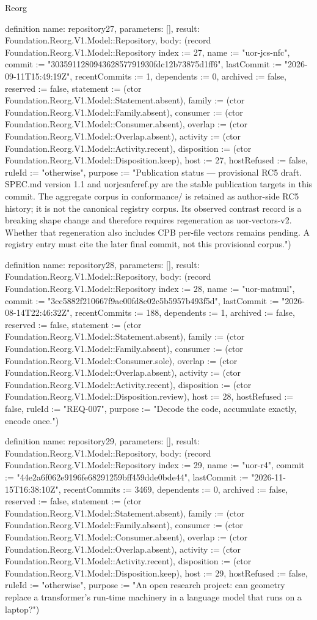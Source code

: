 \begin{lexlean}{Reorg}
\begin{semanticmodule}
definition{
  name: repository27,
  parameters: [],
  result: Foundation.Reorg.V1.Model::Repository,
  body: (record Foundation.Reorg.V1.Model::Repository {index := 27, name := "uor-jcs-nfc", commit := "303591128094362857791930fdc12b73875d1ff6", lastCommit := "2026-09-11T15:49:19Z", recentCommits := 1, dependents := 0, archived := false, reserved := false, statement := (ctor Foundation.Reorg.V1.Model::Statement.absent), family := (ctor Foundation.Reorg.V1.Model::Family.absent), consumer := (ctor Foundation.Reorg.V1.Model::Consumer.absent), overlap := (ctor Foundation.Reorg.V1.Model::Overlap.absent), activity := (ctor Foundation.Reorg.V1.Model::Activity.recent), disposition := (ctor Foundation.Reorg.V1.Model::Disposition.keep), host := 27, hostRefused := false, ruleId := "otherwise", purpose := "Publication status — provisional RC5 draft. SPEC.md version 1.1 and uorjcsnfcref.py are the stable publication targets in this commit. The aggregate corpus in conformance/ is retained as author-side RC5 history; it is not the canonical registry corpus. Its observed contrast record is a breaking shape change and therefore requires regeneration as uor-vectors-v2. Whether that regeneration also includes CPB per-file vectors remains pending. A registry entry must cite the later final commit, not this provisional corpus."})
}

definition{
  name: repository28,
  parameters: [],
  result: Foundation.Reorg.V1.Model::Repository,
  body: (record Foundation.Reorg.V1.Model::Repository {index := 28, name := "uor-matmul", commit := "3cc5882f210667f9ac00fd8c02c5b5957b493f5d", lastCommit := "2026-08-14T22:46:32Z", recentCommits := 188, dependents := 1, archived := false, reserved := false, statement := (ctor Foundation.Reorg.V1.Model::Statement.absent), family := (ctor Foundation.Reorg.V1.Model::Family.absent), consumer := (ctor Foundation.Reorg.V1.Model::Consumer.sole), overlap := (ctor Foundation.Reorg.V1.Model::Overlap.absent), activity := (ctor Foundation.Reorg.V1.Model::Activity.recent), disposition := (ctor Foundation.Reorg.V1.Model::Disposition.review), host := 28, hostRefused := false, ruleId := "REQ-007", purpose := "Decode the code, accumulate exactly, encode once."})
}

definition{
  name: repository29,
  parameters: [],
  result: Foundation.Reorg.V1.Model::Repository,
  body: (record Foundation.Reorg.V1.Model::Repository {index := 29, name := "uor-r4", commit := "44e2a6f062e9196fe68291259bff459dde0bde44", lastCommit := "2026-11-15T16:38:10Z", recentCommits := 3469, dependents := 0, archived := false, reserved := false, statement := (ctor Foundation.Reorg.V1.Model::Statement.absent), family := (ctor Foundation.Reorg.V1.Model::Family.absent), consumer := (ctor Foundation.Reorg.V1.Model::Consumer.absent), overlap := (ctor Foundation.Reorg.V1.Model::Overlap.absent), activity := (ctor Foundation.Reorg.V1.Model::Activity.recent), disposition := (ctor Foundation.Reorg.V1.Model::Disposition.keep), host := 29, hostRefused := false, ruleId := "otherwise", purpose := "An open research project: can geometry replace a transformer's run-time machinery in a language model that runs on a laptop?"})
}


\end{semanticmodule}
\end{lexlean}
